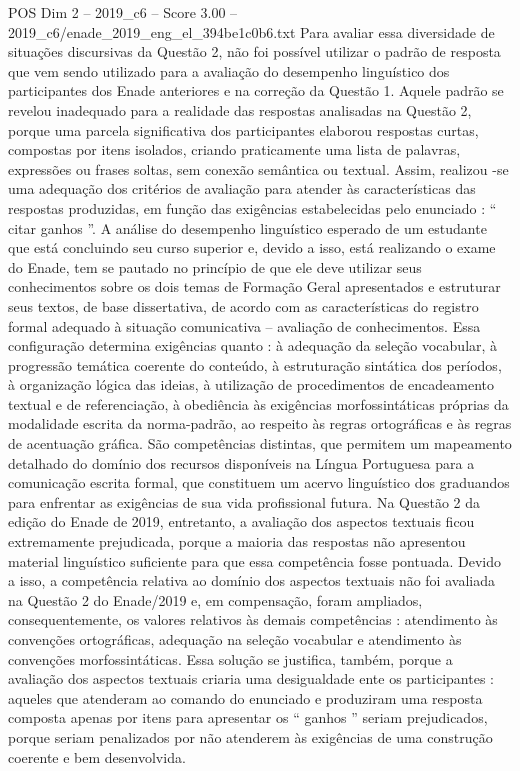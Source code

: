 \begin{textsample}{POS Dim 2 – 2019\_c6 – Score 3.00 – 2019\_c6/enade\_2019\_eng\_el\_394be1c0b6.txt}
Para avaliar essa diversidade de situações discursivas da Questão 2, não foi possível utilizar o padrão de resposta que vem sendo utilizado para a avaliação do desempenho linguístico dos participantes dos Enade anteriores e na correção da Questão 1.
Aquele padrão se revelou inadequado para a realidade das respostas analisadas na Questão 2, porque uma parcela significativa dos participantes elaborou respostas curtas, compostas por itens isolados, criando praticamente uma lista de palavras, expressões ou frases soltas, sem conexão semântica ou textual.
Assim, realizou -se uma adequação dos critérios de avaliação para atender às características das respostas produzidas, em função das exigências estabelecidas pelo enunciado : “ citar ganhos ”.
A análise do desempenho linguístico esperado de um estudante que está concluindo seu curso superior e, devido a isso, está realizando o exame do Enade, tem se pautado no princípio de que ele deve utilizar seus conhecimentos sobre os dois temas de Formação Geral apresentados e estruturar seus textos, de base dissertativa, de acordo com as características do registro formal adequado à situação comunicativa – avaliação de conhecimentos.
Essa configuração determina exigências quanto : à adequação da seleção vocabular, à progressão temática coerente do conteúdo, à estruturação sintática dos períodos, à organização lógica das ideias, à utilização de procedimentos de encadeamento textual e de referenciação, à obediência às exigências morfossintáticas próprias da modalidade escrita da norma-padrão, ao respeito às regras ortográficas e às regras de acentuação gráfica.
São competências distintas, que permitem um mapeamento detalhado do domínio dos recursos disponíveis na Língua Portuguesa para a comunicação escrita formal, que constituem um acervo linguístico dos graduandos para enfrentar as exigências de sua vida profissional futura.
Na Questão 2 da edição do Enade de 2019, entretanto, a avaliação dos aspectos textuais ficou extremamente prejudicada, porque a maioria das respostas não apresentou material linguístico suficiente para que essa competência fosse pontuada.
Devido a isso, a competência relativa ao domínio dos aspectos textuais não foi avaliada na Questão 2 do Enade/2019 e, em compensação, foram ampliados, consequentemente, os valores relativos às demais competências : atendimento às convenções ortográficas, adequação na seleção vocabular e atendimento às convenções morfossintáticas.
Essa solução se justifica, também, porque a avaliação dos aspectos textuais criaria uma desigualdade ente os participantes : aqueles que atenderam ao comando do enunciado e produziram uma resposta composta apenas por itens para apresentar os “ ganhos ” seriam prejudicados, porque seriam penalizados por não atenderem às exigências de uma construção coerente e bem desenvolvida.

\end{textsample}
